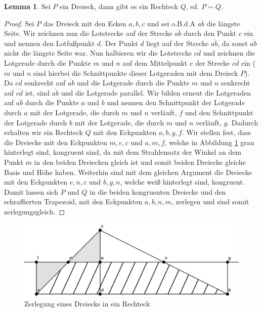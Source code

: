 \documentclass[11pt,titlepage]{article}
\theoremstyle{definition}
\newtheorem{lemma}[theorem]{Lemma}
\theoremstyle{remark}
\begin{document}
	\begin{lemma}
		Sei $P$ ein Dreieck, dann gibt es ein Rechteck $Q$, sd. $P\sim Q$. \label{lemma:dreieck,rechteck}
	\end{lemma}
	
	\begin{proof}
		Sei $P$ das Dreieck mit den Ecken $a,b,c$ und sei o.B.d.A $\overline{ab}$ die längste Seite. Wir zeichnen 
		nun die Lotstrecke auf der Strecke $\overline{ab}$ durch den Punkt $c$ ein und nennen den Lotfußpunkt $d$. 
		Der Punkt $d$ liegt auf der Strecke $\overline{ab}$, da sonst $\overline{ab}$ nicht die längste Seite war. 
		Nun halbieren wir die Lotstrecke $\overline{cd}$ und zeichnen die Lotgerade durch die Punkte $m$ und $n$ 
		auf dem Mittelpunkt $e$ der Strecke $\overline{cd}$ ein ($m$ und $n$ sind hierbei die Schnittpunkte 
		dieser Lotgeraden mit dem Dreieck $P$). Da $\overline{cd}$ senkrecht auf $\overline{ab}$ und die Lotgerade 
		durch die Punkte $m$ und $n$ 
		senkrecht auf $\overline{cd}$ ist, sind $\overline{ab}$ und die Lotgerade parallel. Wir bilden erneut die 
		Lotgeraden auf $\overline{ab}$ durch die Punkte $a$ und $b$ und nennen den Schnittpunkt der Lotgerade 
		durch $a$ mit der Lotgerade, die durch $m$ und $n$ verläuft, $f$ und den Schnittpunkt der Lotgerade durch 
		$b$ mit der Lotgerade, die durch $m$ und $n$ verläuft, $g$. Dadurch erhalten wir ein Rechteck $Q$ mit den 
		Eckpunkten $a,b,g,f$. Wir stellen fest, dass die Dreiecke mit den Eckpunkten $m,e,c$ und $a,m,f$, welche in 
		Abbildung \ref{Abb.1} grau hinterlegt sind, kongruent sind, da mit dem Strahlensatz der Winkel an dem 
		Punkt $m$ in den beiden Dreiecken gleich ist und somit beiden Dreiecke gleiche Basis und Höhe haben. 
		Weiterhin sind mit dem gleichen Argument die Dreiecke mit den Eckpunkten $e,n,c$ und $b,g,n$, welche weiß 
		hinterlegt sind, kongruent. Damit lassen sich $P$ und $Q$ in die beiden 
		kongruenten Dreiecke und den schraffierten Trapezoid, mit den Eckpunkten $a,b,n,m$, zerlegen und sind somit 
		zerlegungsgleich.
	\end{proof}
	
	\begin{figure}[!htbp]
		\centering
		\includegraphics[scale=1.6]{DreieckLemma}
		\caption{Zerlegung eines Dreiecks in ein Rechteck}
		\label{Abb.1}
	\end{figure}
	
\end{document}
